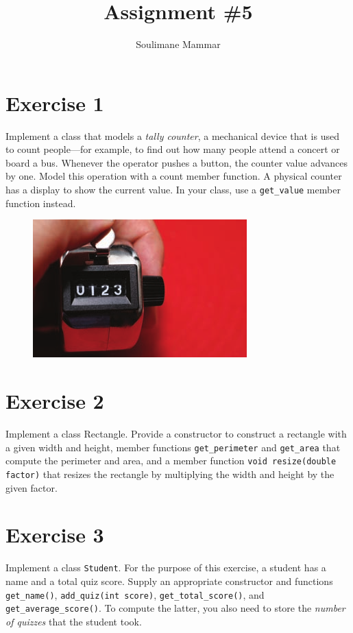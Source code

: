 \documentclass[10pt,a4paper]{article}
\author{Soulimane Mammar}
\title{Assignment \#5}
\begin{document}
	\maketitle
	\section*{Exercise 1}
	Implement a class that models a \emph{tally counter}, a mechanical device that is used to count people—for example, to find out how many people attend a concert or board a bus. Whenever the operator pushes a button, the counter	value advances by one. Model this operation with a count member function. A physical counter has a display to	show the current value. In your class, use a \verb|get_value| member function instead.
	\begin{figure}[H]
		\centering
		\includegraphics[width=0.4\linewidth]{counter}
		\label{fig:counter}
	\end{figure}
	
	\section*{Exercise 2}
	Implement a class Rectangle. Provide a constructor to construct a rectangle with a
	given width and height, member functions \verb|get_perimeter| and \verb|get_area| that compute
	the perimeter and area, and a member function \verb|void resize(double factor)| that resizes
	the rectangle by multiplying the width and height by the given factor.
	
	\section*{Exercise 3}
	Implement a class \verb|Student|. For the purpose of this exercise, a student has a name and
	a total quiz score. Supply an appropriate constructor and functions \verb|get_name()|,
	\verb|add_quiz(int score)|, \verb|get_total_score()|, and \verb|get_average_score()|. To compute the latter,	you also need to store the \emph{number of quizzes} that the student took.
	
\end{document}
